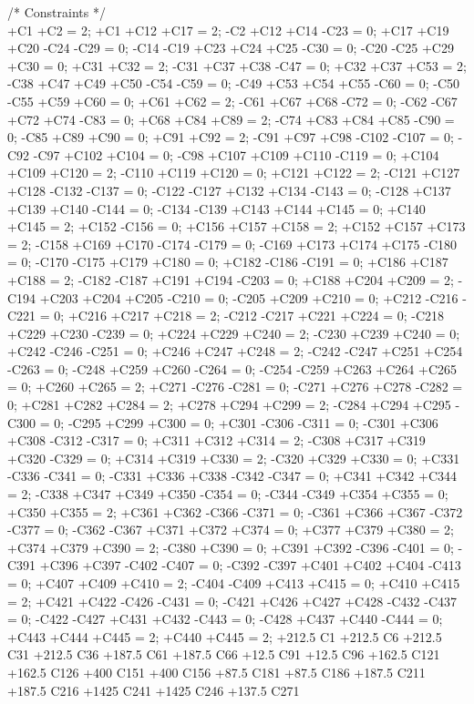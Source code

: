 /* Constraints */ \\
+C1 +C2 = 2;
+C1 +C12 +C17 = 2;
-C2 +C12 +C14 -C23 = 0;
+C17 +C19 +C20 -C24 -C29 = 0;
-C14 -C19 +C23 +C24 +C25 -C30 = 0;
-C20 -C25 +C29 +C30 = 0;
+C31 +C32 = 2;
-C31 +C37 +C38 -C47 = 0;
+C32 +C37 +C53 = 2;
-C38 +C47 +C49 +C50 -C54 -C59 = 0;
-C49 +C53 +C54 +C55 -C60 = 0;
-C50 -C55 +C59 +C60 = 0;
+C61 +C62 = 2;
-C61 +C67 +C68 -C72 = 0;
-C62 -C67 +C72 +C74 -C83 = 0;
+C68 +C84 +C89 = 2;
-C74 +C83 +C84 +C85 -C90 = 0;
-C85 +C89 +C90 = 0;
+C91 +C92 = 2;
-C91 +C97 +C98 -C102 -C107 = 0;
-C92 -C97 +C102 +C104 = 0;
-C98 +C107 +C109 +C110 -C119 = 0;
+C104 +C109 +C120 = 2;
-C110 +C119 +C120 = 0;
+C121 +C122 = 2;
-C121 +C127 +C128 -C132 -C137 = 0;
-C122 -C127 +C132 +C134 -C143 = 0;
-C128 +C137 +C139 +C140 -C144 = 0;
-C134 -C139 +C143 +C144 +C145 = 0;
+C140 +C145 = 2;
+C152 -C156 = 0;
+C156 +C157 +C158 = 2;
+C152 +C157 +C173 = 2;
-C158 +C169 +C170 -C174 -C179 = 0;
-C169 +C173 +C174 +C175 -C180 = 0;
-C170 -C175 +C179 +C180 = 0;
+C182 -C186 -C191 = 0;
+C186 +C187 +C188 = 2;
-C182 -C187 +C191 +C194 -C203 = 0;
+C188 +C204 +C209 = 2;
-C194 +C203 +C204 +C205 -C210 = 0;
-C205 +C209 +C210 = 0;
+C212 -C216 -C221 = 0;
+C216 +C217 +C218 = 2;
-C212 -C217 +C221 +C224 = 0;
-C218 +C229 +C230 -C239 = 0;
+C224 +C229 +C240 = 2;
-C230 +C239 +C240 = 0;
+C242 -C246 -C251 = 0;
+C246 +C247 +C248 = 2;
-C242 -C247 +C251 +C254 -C263 = 0;
-C248 +C259 +C260 -C264 = 0;
-C254 -C259 +C263 +C264 +C265 = 0;
+C260 +C265 = 2;
+C271 -C276 -C281 = 0;
-C271 +C276 +C278 -C282 = 0;
+C281 +C282 +C284 = 2;
+C278 +C294 +C299 = 2;
-C284 +C294 +C295 -C300 = 0;
-C295 +C299 +C300 = 0;
+C301 -C306 -C311 = 0;
-C301 +C306 +C308 -C312 -C317 = 0;
+C311 +C312 +C314 = 2;
-C308 +C317 +C319 +C320 -C329 = 0;
+C314 +C319 +C330 = 2;
-C320 +C329 +C330 = 0;
+C331 -C336 -C341 = 0;
-C331 +C336 +C338 -C342 -C347 = 0;
+C341 +C342 +C344 = 2;
-C338 +C347 +C349 +C350 -C354 = 0;
-C344 -C349 +C354 +C355 = 0;
+C350 +C355 = 2;
+C361 +C362 -C366 -C371 = 0;
-C361 +C366 +C367 -C372 -C377 = 0;
-C362 -C367 +C371 +C372 +C374 = 0;
+C377 +C379 +C380 = 2;
+C374 +C379 +C390 = 2;
-C380 +C390 = 0;
+C391 +C392 -C396 -C401 = 0;
-C391 +C396 +C397 -C402 -C407 = 0;
-C392 -C397 +C401 +C402 +C404 -C413 = 0;
+C407 +C409 +C410 = 2;
-C404 -C409 +C413 +C415 = 0;
+C410 +C415 = 2;
+C421 +C422 -C426 -C431 = 0;
-C421 +C426 +C427 +C428 -C432 -C437 = 0;
-C422 -C427 +C431 +C432 -C443 = 0;
-C428 +C437 +C440 -C444 = 0;
+C443 +C444 +C445 = 2;
+C440 +C445 = 2;
+212.5 C1 +212.5 C6 +212.5 C31 +212.5 C36 +187.5 C61 +187.5 C66 +12.5 C91 +12.5 C96 +162.5 C121 +162.5 C126
 +400 C151 +400 C156 +87.5 C181 +87.5 C186 +187.5 C211 +187.5 C216 +1425 C241 +1425 C246 +137.5 C271
